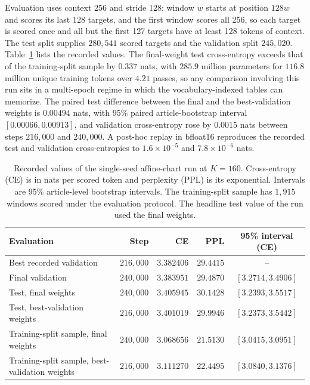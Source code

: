 \documentclass[twoside,11pt]{article}
\begin{document}
Evaluation uses context 256 and stride 128: window $w$ starts at position $128w$ and scores its last 128 targets, and the first window scores all 256, so each target is scored once and all but the first 127 targets have at least 128 tokens of context. The test split supplies $280{,}541$ scored targets and the validation split $245{,}020$. Table~\ref{tab:run_k160} lists the recorded values. The final-weight test cross-entropy exceeds that of the training-split sample by $0.337$ nats, with $285.9$ million parameters for $116.8$ million unique training tokens over $4.21$ passes, so any comparison involving this run sits in a multi-epoch regime in which the vocabulary-indexed tables can memorize. The paired test difference between the final and the best-validation weights is $0.00494$ nats, with 95\% paired article-bootstrap interval $[0.00066,0.00913]$, and validation cross-entropy rose by $0.0015$ nats between steps $216{,}000$ and $240{,}000$. A post-hoc replay in bfloat16 reproduces the recorded test and validation cross-entropies to $1.6\times10^{-5}$ and $7.8\times10^{-6}$ nats.

\begin{table}[htbp]
\centering
\small
\begin{tabular}{@{}lrrrc@{}}
\toprule
Evaluation & Step & CE & PPL & 95\% interval (CE) \\
\midrule
Best recorded validation & $216{,}000$ & $3.382406$ & $29.4415$ & -- \\
Final validation & $240{,}000$ & $3.383951$ & $29.4870$ & $[3.2714,3.4906]$ \\
Test, final weights & $240{,}000$ & $3.405945$ & $30.1428$ & $[3.2393,3.5517]$ \\
Test, best-validation weights & $216{,}000$ & $3.401019$ & $29.9946$ & $[3.2373,3.5442]$ \\
Training-split sample, final weights & $240{,}000$ & $3.068656$ & $21.5130$ & $[3.0415,3.0951]$ \\
Training-split sample, best-validation weights & $216{,}000$ & $3.111270$ & $22.4495$ & $[3.0840,3.1376]$ \\
\bottomrule
\end{tabular}
\caption{Recorded values of the single-seed affine-chart run at $K=160$. Cross-entropy (CE) is in nats per scored token and perplexity (PPL) is its exponential. Intervals are 95\% article-level bootstrap intervals. The training-split sample has $1{,}915$ windows scored under the evaluation protocol. The headline test value of the run used the final weights.}
\label{tab:run_k160}
\end{table}
\end{document}
